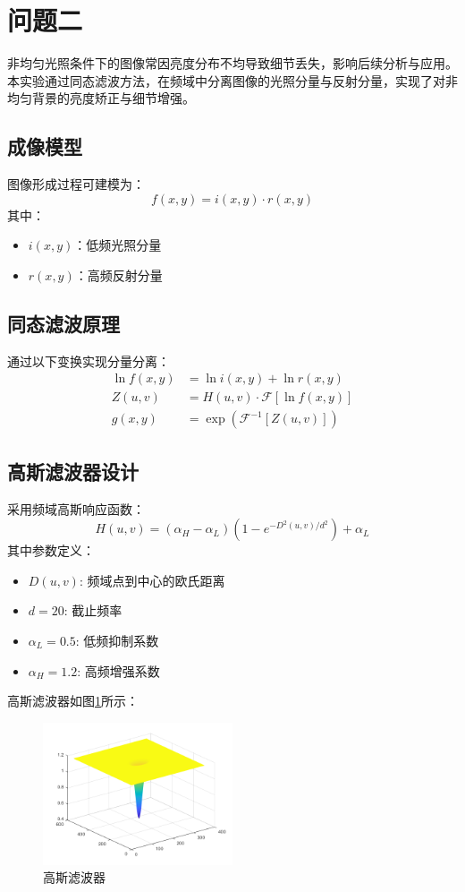\documentclass[UTF8]{article}
\begin{document}
\section{问题二}
非均匀光照条件下的图像常因亮度分布不均导致细节丢失，影响后续分析与应用。
本实验通过同态滤波方法，在频域中分离图像的光照分量与反射分量，实现了对非均匀背景的亮度矫正与细节增强。
\subsection{成像模型}
图像形成过程可建模为：
\begin{equation}
    f(x,y) = i(x,y) \cdot r(x,y)
\end{equation}
其中：
\begin{itemize}
    \item $i(x,y)$：低频光照分量
    \item $r(x,y)$：高频反射分量
\end{itemize}

\subsection{同态滤波原理}
通过以下变换实现分量分离：
\begin{align}
    \ln f(x,y) &= \ln i(x,y) + \ln r(x,y) \\
    Z(u,v) &= H(u,v) \cdot \mathcal{F}[\ln f(x,y)] \\
    g(x,y) &= \exp\left( \mathcal{F}^{-1}[Z(u,v)] \right)
\end{align}

\subsection{高斯滤波器设计}
采用频域高斯响应函数：
\begin{equation}
    H(u,v) = (\alpha_H - \alpha_L)(1 - e^{-D^2(u,v)/d^2}) + \alpha_L
\end{equation}
其中参数定义：
\begin{itemize}
    \item $D(u,v)$: 频域点到中心的欧氏距离
    \item $d=20$: 截止频率
    \item $\alpha_L=0.5$: 低频抑制系数
    \item $\alpha_H=1.2$: 高频增强系数
\end{itemize}
高斯滤波器如图\ref{fig:gaussian}所示：
\begin{figure}[htbp]
    \centering
    \includegraphics[width=0.5\textwidth]{../img/filter.png} %
    \caption{高斯滤波器}
    \label{fig:gaussian}
\end{figure}
\end{document}
